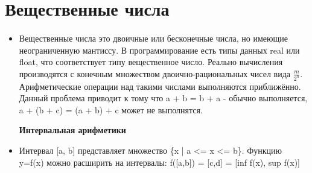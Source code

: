 \documentclass{article}
\begin{document}
\section{Вещественные числа}
\paragraph{}

\begin{itemize}
\item[] Вещественные числа это двоичные или бесконечные числа, но имеющие неограниченную мантиссу. 
В программирование есть типы данных real или float, что соответствует типу вещественное число. Реально вычисления производятся
с конечным множеством двоично-рациональных чисел вида $\frac{m}{2^n}$. Арифметические операции над такими числами выполняются
приближённо. Данный проблема приводит к тому что a + b = b + a - обычно выполняется, a + (b + c) = (a + b) + c может не выполнятся.


\textbf{Интервальная арифметики}


\item[] Интервал [a, b] представляет множество \{x | a <= x <= b\}. Функцию y=f(x) можно расширить на интервалы:
f([a,b]) = [c,d] = [inf f(x), sup f(x)]


\end{itemize}
\end{document}
